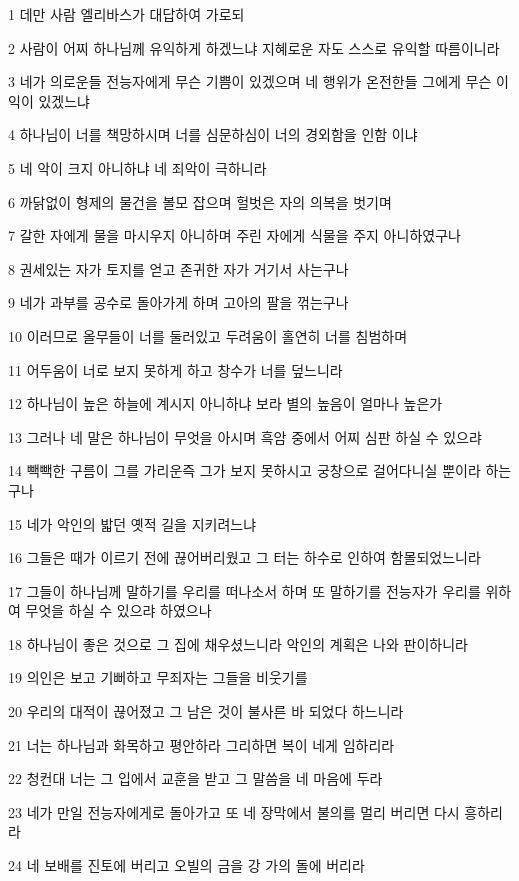 \par 1 데만 사람 엘리바스가 대답하여 가로되
\par 2 사람이 어찌 하나님께 유익하게 하겠느냐 지혜로운 자도 스스로 유익할 따름이니라
\par 3 네가 의로운들 전능자에게 무슨 기쁨이 있겠으며 네 행위가 온전한들 그에게 무슨 이익이 있겠느냐
\par 4 하나님이 너를 책망하시며 너를 심문하심이 너의 경외함을 인함 이냐
\par 5 네 악이 크지 아니하냐 네 죄악이 극하니라
\par 6 까닭없이 형제의 물건을 볼모 잡으며 헐벗은 자의 의복을 벗기며
\par 7 갈한 자에게 물을 마시우지 아니하며 주린 자에게 식물을 주지 아니하였구나
\par 8 권세있는 자가 토지를 얻고 존귀한 자가 거기서 사는구나
\par 9 네가 과부를 공수로 돌아가게 하며 고아의 팔을 꺾는구나
\par 10 이러므로 올무들이 너를 둘러있고 두려움이 홀연히 너를 침범하며
\par 11 어두움이 너로 보지 못하게 하고 창수가 너를 덮느니라
\par 12 하나님이 높은 하늘에 계시지 아니하냐 보라 별의 높음이 얼마나 높은가
\par 13 그러나 네 말은 하나님이 무엇을 아시며 흑암 중에서 어찌 심판 하실 수 있으랴
\par 14 빽빽한 구름이 그를 가리운즉 그가 보지 못하시고 궁창으로 걸어다니실 뿐이라 하는구나
\par 15 네가 악인의 밟던 옛적 길을 지키려느냐
\par 16 그들은 때가 이르기 전에 끊어버리웠고 그 터는 하수로 인하여 함몰되었느니라
\par 17 그들이 하나님께 말하기를 우리를 떠나소서 하며 또 말하기를 전능자가 우리를 위하여 무엇을 하실 수 있으랴 하였으나
\par 18 하나님이 좋은 것으로 그 집에 채우셨느니라 악인의 계획은 나와 판이하니라
\par 19 의인은 보고 기뻐하고 무죄자는 그들을 비웃기를
\par 20 우리의 대적이 끊어졌고 그 남은 것이 불사른 바 되었다 하느니라
\par 21 너는 하나님과 화목하고 평안하라 그리하면 복이 네게 임하리라
\par 22 청컨대 너는 그 입에서 교훈을 받고 그 말씀을 네 마음에 두라
\par 23 네가 만일 전능자에게로 돌아가고 또 네 장막에서 불의를 멀리 버리면 다시 흥하리라
\par 24 네 보배를 진토에 버리고 오빌의 금을 강 가의 돌에 버리라
